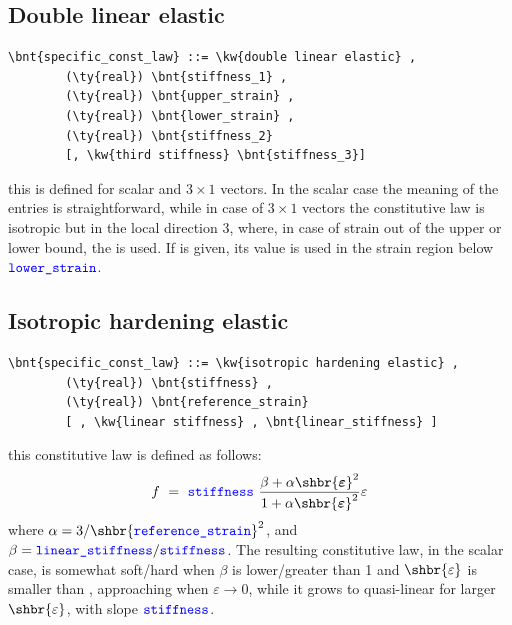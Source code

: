 \subsection{Double linear elastic}
\begin{Verbatim}[commandchars=\\\{\}]
    \bnt{specific_const_law} ::= \kw{double linear elastic} ,
        (\ty{real}) \bnt{stiffness_1} ,
        (\ty{real}) \bnt{upper_strain} ,
        (\ty{real}) \bnt{lower_strain} ,
        (\ty{real}) \bnt{stiffness_2}
        [, \kw{third stiffness} \bnt{stiffness_3}]
\end{Verbatim}
this is defined for scalar and $3 \times 1$ vectors. In the scalar case the
meaning of the entries is straightforward,
while in case of $3 \times 1$ vectors the constitutive law is isotropic
but in the local direction 3, where, in case of strain
out of the upper or lower bound, the  is used.
If  is given, its value is used in the strain region 
below $\textcolor{blue}{\texttt{lower\_strain}}$.
\subsection{Isotropic hardening elastic}
\begin{Verbatim}[commandchars=\\\{\}]
    \bnt{specific_const_law} ::= \kw{isotropic hardening elastic} ,
        (\ty{real}) \bnt{stiffness} ,
        (\ty{real}) \bnt{reference_strain}
        [ , \kw{linear stiffness} , \bnt{linear_stiffness} ]
\end{Verbatim}
this constitutive law is defined as follows:
\begin{displaymath}
    f \ = \ \nt{stiffness} \ \frac{
        \beta + \alpha\shbr{\T{\varepsilon}}^2
    }{
        1 + \alpha\shbr{\T{\varepsilon}}^2
    }\varepsilon
\end{displaymath}
where $\alpha=3/\shbr{\nt{reference\_strain}}^2$,
and $\beta=\textcolor{blue}{\texttt{linear\_stiffness}}/\textcolor{blue}{\texttt{stiffness}}$.
The resulting constitutive law, in the scalar case,
is somewhat soft/hard when $\beta$ is lower/greater than 1
and $\shbr{\varepsilon}$ is smaller than ,
approaching  when $\varepsilon\rightarrow{0}$,
while it grows to quasi-linear for larger $\shbr{\varepsilon}$, 
with slope $\textcolor{blue}{\texttt{stiffness}}$.


